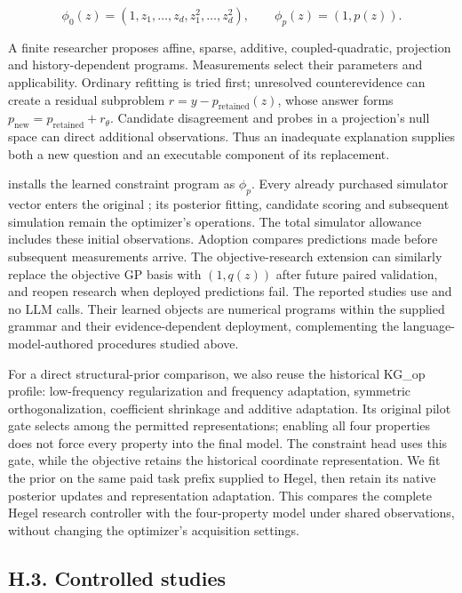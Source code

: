 \documentclass[twoside,11pt]{article}
\begin{document}
\[
\phi_0(z)=(1,z_1,\ldots,z_d,z_1^2,\ldots,z_d^2),
\qquad \phi_p(z)=(1,p(z)).
\]


A finite researcher proposes affine, sparse, additive, coupled-quadratic,
projection and history-dependent programs. Measurements select their parameters
and applicability. Ordinary refitting is tried first; unresolved counterevidence
can create a residual subproblem \(r=y-p_{\mathrm{retained}}(z)\), whose answer
forms \(p_{\mathrm{new}}=p_{\mathrm{retained}}+r_\theta\). Candidate disagreement
and probes in a projection's null space can direct additional observations.
Thus an inadequate explanation supplies both a new question and an executable
component of its replacement.


 installs the learned constraint program as \(\phi_p\).
Every already purchased simulator vector enters the original
; its posterior fitting, candidate scoring and subsequent
simulation remain the optimizer's operations. The total simulator allowance
includes these initial observations. Adoption compares predictions made before
subsequent measurements arrive. The objective-research extension can similarly
replace the objective GP basis with \((1,q(z))\) after future paired validation,
and reopen research when deployed predictions fail. The reported studies use
 and no LLM calls. Their learned objects are numerical programs
within the supplied grammar and their evidence-dependent deployment, complementing
the language-model-authored procedures studied above.


For a direct structural-prior comparison, we also reuse the historical KG\_op
 profile: low-frequency regularization and frequency adaptation, symmetric
orthogonalization, coefficient shrinkage and additive adaptation. Its original
pilot gate selects among the permitted representations; enabling all four
properties does not force every property into the final model. The constraint
head uses this gate, while the objective retains the historical coordinate
representation. We fit the prior on the same paid task prefix supplied to Hegel,
then retain its native posterior updates and representation adaptation. This
compares the complete Hegel research controller with the four-property model
under shared observations, without changing the optimizer's acquisition settings.


\subsection*{H.3. Controlled studies}
\end{document}
